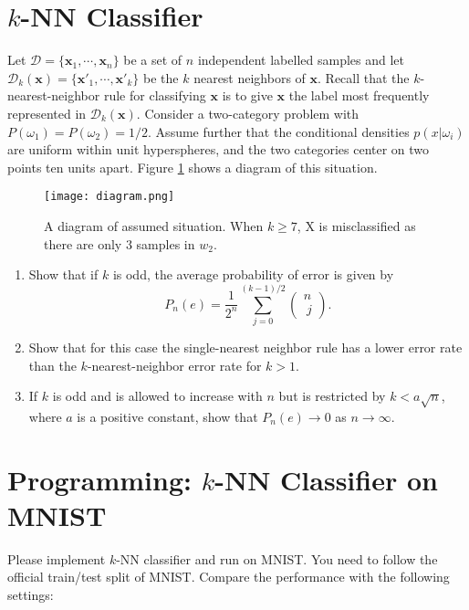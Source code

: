 \documentclass{article}
\theoremstyle{definition}
\theoremstyle{definition}
\theoremstyle{remark}
\begin{document}
\section{$k$-NN Classifier}

Let $\mathcal{D}=\{\bm{x}_1, \cdots, \bm{x}_n\}$ be a set of $n$ independent labelled samples and let $\mathcal{D}_k(\bm{x})=\{\bm{x}'_1, \cdots, \bm{x}'_k\}$ be the $k$ nearest neighbors of $\bm{x}$. Recall that the $k$-nearest-neighbor rule for classifying $\bm{x}$ is to give $\bm{x}$ the label most frequently represented in $\mathcal{D}_k(\bm{x})$. Consider a two-category problem with $P(\omega_1) = P(\omega_2) = 1/2$. Assume further that the conditional densities $p(x|\omega_i)$ are uniform within unit hyperspheres, and the two categories center on two points ten units apart. Figure \ref{pic2} shows a diagram of this situation.
\begin{figure}[!h]
	\centering
	\texttt{[image: diagram.png]}
	\caption{A diagram of assumed situation. When $k\ge7$, X is misclassified as there are only $3$ samples in $w_2$.}
	\label{pic2}
\end{figure}

\begin{enumerate}
    \item Show that if $k$ is odd, the average probability of error is given by
\begin{equation}\nonumber
    P_n(e) = \frac{1}{2^n}\sum_{j=0}^{(k-1)/2}{\left( \begin{matrix}n \\\ j \end{matrix} \right)}.
\end{equation}
    \item Show that for this case the single-nearest neighbor rule has a lower error rate than the $k$-nearest-neighbor error rate for $k>1$.
    \item If $k$ is odd and is allowed to increase with $n$ but is restricted by $k < a\sqrt{n}$, where $a$ is a positive constant, show that $P_n(e) \to 0$ as $n \to \infty$.
\end{enumerate}

\section{Programming: $k$-NN Classifier on MNIST}
Please implement $k$-NN classifier and run on MNIST\cite{mnist}.
You need to follow the official train/test split of MNIST. Compare the performance with the following settings:
\end{document}
